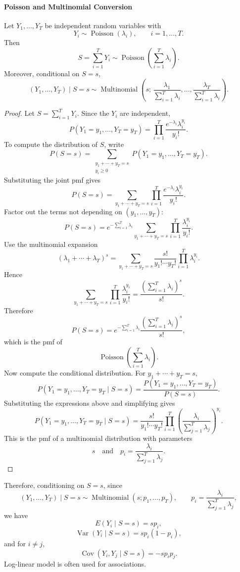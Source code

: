 \documentclass[11pt]{article}
\theoremstyle{definition}
\begin{document}
\paragraph{Poisson and Multinomial Conversion}
Let $Y_1,\dots,Y_T$ be independent random variables with
\[
Y_i \sim \operatorname{Poisson}(\lambda_i), \qquad i=1,\dots,T .
\]
Then
\[
S=\sum_{i=1}^T Y_i \sim \operatorname{Poisson}\!\left(\sum_{i=1}^T \lambda_i\right).
\]
Moreover, conditional on $S=s$,
\[
(Y_1,\dots,Y_T)\mid S=s
\sim
\operatorname{Multinomial}
\left(s;\,
\frac{\lambda_1}{\sum_{i=1}^T\lambda_i},
\dots,
\frac{\lambda_T}{\sum_{i=1}^T\lambda_i}
\right).
\]

\begin{proof}
Let $S=\sum_{i=1}^T Y_i$. Since the $Y_i$ are independent,
\[
P(Y_1=y_1,\dots,Y_T=y_T)
=
\prod_{i=1}^T
\frac{e^{-\lambda_i}\lambda_i^{y_i}}{y_i!}.
\]
To compute the distribution of $S$, write
\[
P(S=s)
=
\sum_{\substack{y_1+\cdots+y_T=s \\ y_i\ge0}}
P(Y_1=y_1,\dots,Y_T=y_T).
\]
Substituting the joint pmf gives
\[
P(S=s)
=
\sum_{y_1+\cdots+y_T=s}
\prod_{i=1}^T
\frac{e^{-\lambda_i}\lambda_i^{y_i}}{y_i!}.
\]
Factor out the terms not depending on $(y_1,\dots,y_T)$:
\[
P(S=s)
=
e^{-\sum_{i=1}^T\lambda_i}
\sum_{y_1+\cdots+y_T=s}
\prod_{i=1}^T
\frac{\lambda_i^{y_i}}{y_i!}.
\]
Use the multinomial expansion
\[
(\lambda_1+\cdots+\lambda_T)^s
=
\sum_{y_1+\cdots+y_T=s}
\frac{s!}{y_1!\cdots y_T!}
\prod_{i=1}^T \lambda_i^{y_i}.
\]
Hence
\[
\sum_{y_1+\cdots+y_T=s}
\prod_{i=1}^T
\frac{\lambda_i^{y_i}}{y_i!}
=
\frac{(\sum_{i=1}^T\lambda_i)^s}{s!}.
\]
Therefore
\[
P(S=s)
=
e^{-\sum_{i=1}^T\lambda_i}
\frac{(\sum_{i=1}^T\lambda_i)^s}{s!},
\]
which is the pmf of
\[
\operatorname{Poisson}\!\left(\sum_{i=1}^T\lambda_i\right).
\]
Now compute the conditional distribution. For $y_1+\cdots+y_T=s$,
\[
P(Y_1=y_1,\dots,Y_T=y_T\mid S=s)
=
\frac{P(Y_1=y_1,\dots,Y_T=y_T)}{P(S=s)}.
\]
Substituting the expressions above and simplifying gives
\[
P(Y_1=y_1,\dots,Y_T=y_T\mid S=s)
=
\frac{s!}{y_1!\cdots y_T!}
\prod_{i=1}^T
\left(
\frac{\lambda_i}{\sum_{j=1}^T\lambda_j}
\right)^{y_i}.
\]
This is the pmf of a multinomial distribution with parameters
\[
s
\quad\text{and}\quad
p_i=\frac{\lambda_i}{\sum_{j=1}^T\lambda_j}.
\]
\end{proof}
Therefore, conditioning on $S=s$, since
\[
(Y_1,\dots,Y_T)\mid S=s
\sim
\operatorname{Multinomial}(s; p_1,\dots,p_T),
\qquad
p_i=\frac{\lambda_i}{\sum_{j=1}^T\lambda_j},
\]
we have
\[
E(Y_i\mid S=s)=sp_i,
\]
\[
\operatorname{Var}(Y_i\mid S=s)=sp_i(1-p_i),
\]
and for $i\neq j$,
\[
\operatorname{Cov}(Y_i,Y_j\mid S=s)=-sp_ip_j.
\]
Log-linear model is often used for associations.
\end{document}
